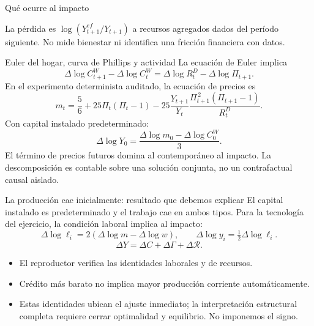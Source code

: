 \documentclass[aspectratio=169,11pt]{beamer}
\begin{document}
\begin{frame}{Qué ocurre al impacto}
\centering\small
\medskip\par\raggedright
La pérdida es $\log(Y^{ef}_{t+1}/Y_{t+1})$ a recursos agregados dados del período
siguiente. No mide bienestar ni identifica una fricción financiera con datos.
\end{frame}

\begin{frame}{Euler del hogar, curva de Phillips y actividad}
\small
La ecuación de Euler implica
\[
\Delta\log C^W_{t+1}-\Delta\log C^W_t
=\Delta\log R^D_t-\Delta\log\Pi_{t+1}.
\]
En el experimento determinista auditado, la ecuación de precios es
\[
m_t=\frac56+25\Pi_t(\Pi_t-1)
-25\frac{Y_{t+1}}{Y_t}
\frac{\Pi_{t+1}^{\,2}(\Pi_{t+1}-1)}{R^D_t}.
\]
Con capital instalado predeterminado:
\[
\boxed{\Delta\log Y_0=
\frac{\Delta\log m_0-\Delta\log C^W_0}{3}}.
\]
\footnotesize
El término de precios futuros domina al contemporáneo al impacto.
La descomposición es contable sobre una solución conjunta, no un
contrafactual causal aislado.
\end{frame}

\begin{frame}{La producción cae inicialmente: resultado que debemos explicar}
El capital instalado es predeterminado y el trabajo cae en ambos tipos.
Para la tecnología del ejercicio, la condición laboral implica al impacto:
\[
\Delta\log\ell_i=2(\Delta\log m-\Delta\log w),\qquad
\Delta\log y_i=\tfrac12\Delta\log\ell_i.
\]
\[
\Delta Y=\Delta C+\Delta\Gamma+\Delta\mathcal R.
\]
\begin{itemize}
\item El reproductor verifica las identidades laborales y de recursos.
\item Crédito más barato no implica mayor producción corriente automáticamente.
\item Estas identidades ubican el ajuste inmediato; la interpretación estructural
completa requiere cerrar optimalidad y equilibrio. No imponemos el signo.
\end{itemize}
\end{frame}
\end{document}
